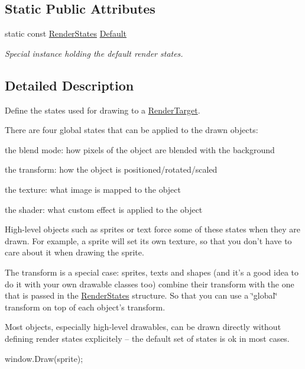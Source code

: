 \subsection*{Static Public Attributes}
\begin{DoxyCompactItemize}
\item 
\hypertarget{classsf_1_1_render_states_ad29672df29f19ce50c3021d95f2bb062}{static const \hyperlink{classsf_1_1_render_states}{Render\+States} \hyperlink{classsf_1_1_render_states_ad29672df29f19ce50c3021d95f2bb062}{Default}}\label{classsf_1_1_render_states_ad29672df29f19ce50c3021d95f2bb062}

\begin{DoxyCompactList}\small\item\em Special instance holding the default render states. \end{DoxyCompactList}\end{DoxyCompactItemize}


\subsection{Detailed Description}
Define the states used for drawing to a \hyperlink{classsf_1_1_render_target}{Render\+Target}. 

There are four global states that can be applied to the drawn objects\+: \begin{DoxyItemize}
\item the blend mode\+: how pixels of the object are blended with the background \item the transform\+: how the object is positioned/rotated/scaled \item the texture\+: what image is mapped to the object \item the shader\+: what custom effect is applied to the object\end{DoxyItemize}
High-\/level objects such as sprites or text force some of these states when they are drawn. For example, a sprite will set its own texture, so that you don't have to care about it when drawing the sprite.

The transform is a special case\+: sprites, texts and shapes (and it's a good idea to do it with your own drawable classes too) combine their transform with the one that is passed in the \hyperlink{classsf_1_1_render_states}{Render\+States} structure. So that you can use a \char`\"{}global\char`\"{} transform on top of each object's transform.

Most objects, especially high-\/level drawables, can be drawn directly without defining render states explicitely -- the default set of states is ok in most cases. 
\begin{DoxyCode}
window.Draw(sprite);
\end{DoxyCode}


